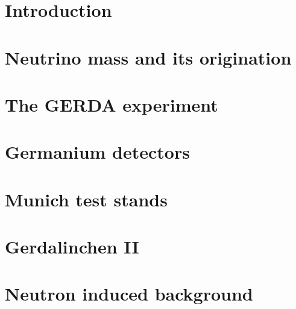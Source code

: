 \documentclass[11pt,a4paper]{book}
\begin{document}
\pagestyle{empty}



\cleardoublepage



\cleardoublepage \setcounter{page}{1} 

\tableofcontents

\cleardoublepage \setcounter{page}{1} 

\pagestyle{headings}

\chapter{Introduction}
\label{cha:intro}

\clearpage{\pagestyle{empty}\cleardoublepage}

\chapter{Neutrino mass and its origination}
\label{cha:theory}

\clearpage{\pagestyle{empty}\cleardoublepage}

\chapter{The GERDA experiment}
\label{cha:gerda}

\clearpage{\pagestyle{empty}\cleardoublepage}

\chapter{Germanium detectors}
\label{cha:detector}

\clearpage{\pagestyle{empty}\cleardoublepage}

\chapter{Munich test stands}
\label{cha:teststand}

\clearpage{\pagestyle{empty}\cleardoublepage}

\chapter{Gerdalinchen II}
\label{cha:gerdalinchenII}

\clearpage{\pagestyle{empty}\cleardoublepage}

\chapter{Neutron induced background}
\label{cha:neutron}

\end{document}
